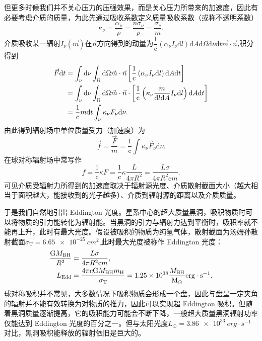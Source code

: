 \documentclass[../天体物理基础.tex]{subfiles}
\begin{document}
但更多时候我们并不关心压力的压强效果，而是关心压力所带来的加速度，因此有必要考虑介质的质量，为此先通过吸收系数定义质量吸收系数（或称不透明系数）
\begin{equation}
\kappa_\nu=\frac{\alpha_\nu}\rho=\frac{n\sigma_{\nu}}{\rho}=\frac{\sigma_\nu}{m}.
\end{equation}
介质吸收某一辐射$I_{\nu}\left(\vec{m}\right)$在$\vec n$方向得到的动量为$\dfrac{1}{\mathrm{c}}\left(\alpha_\nu I_\nu\mathrm{d}l\right)\mathrm{d}A\mathrm{d}\Omega\mathrm{d}\nu\mathrm{d}t\vec{m}\cdot\vec{n}$,积分得到
\begin{align}
\vec{F}\mathrm{d}t&=\int_{\nu}\mathrm{d}\nu\int_{\Omega}\mathrm{d}\Omega\vec{m}\cdot\vec{n}\left[\frac{1}{\mathrm{c}}\left(\alpha_{\nu}I_{\nu}\mathrm{d}l\right)\mathrm{d}A\mathrm{d}t\right]\notag\\
&=\int_{\nu}\mathrm{d}\nu\int_{\Omega}\mathrm{d}\Omega\vec{m}\cdot\vec{n}\cdot\left[\frac{1}{\mathrm{c}}\left(\kappa_{\nu}\frac{m}{\mathrm{d}l\mathrm{d}A}I_{\nu}\mathrm{d}l\right)\mathrm{d}A\mathrm{d}t\right]\notag\\
&=\frac{1}{\mathrm{c}}m\mathrm{d}t\int_{\nu}\kappa_{\nu}F_{\nu}\mathrm{d}\nu.
\end{align}
由此得到辐射场中单位质量受力（加速度）为
\begin{equation}
\vec{f}=\frac{\vec{F}}{m}=\frac{1}{\mathrm{c}}\int\kappa_{\nu}\vec{F}_{\nu}\mathrm{d}\nu.
\end{equation}
在球对称辐射场中常写作
\begin{equation}
f=\frac{1}{\mathrm{c}}\kappa F=\frac{1}{\mathrm{c}}\kappa\dfrac{L}{4\pi R^2}=\frac{L\sigma}{4\pi R^{2}\mathrm{c}m}.
\end{equation}
可见介质受辐射力所得到的加速度取决于辐射源光度、介质散射截面大小（越大相当于面积越大，能接收到的光子越多）、介质到辐射源的距离以及介质质量。

于是我们自然地引出 Eddington 光度。星系中心的超大质量黑洞，吸积物质时可以将物质的引力能转化为辐射能。当黑洞的引力与辐射力达到平衡时，吸积率就不能再上升，此时有最大光度。假设被吸积的物质为纯氢气体，散射截面为汤姆孙散射截面$\sigma_{\text{T}}=\qty{6.65e-25}{cm^{2}}$,此时最大光度被称作 Eddington 光度：
\begin{align}
\frac{\mathrm{G}M_{\text{BH}}}{R^{2}}&=\frac{L\sigma}{4\pi R^{2}\mathrm{c}m},\\
L_{\text{Edd}}&=\frac{4\pi\mathrm{c}\mathrm{G}M_{\text{BH}}m_{\ce{H}}}{\sigma_{\text{T}}}=1.25\times10^{38}\frac{M_{\text{BH}}}{\unit{M_\odot}}\unit{erg\cdot{}s^{-1}}.
\end{align}
球对称吸积并不常见，大多数情况下吸积物质会形成一个盘，因此与盘呈一定夹角的辐射并不能有效转换为对物质的推力，因此可以实现超 Eddington 吸积。但随着黑洞质量逐渐提高，它的吸积能力可能会不断下降，一般超大质量黑洞辐射功率仅能达到 Eddington 光度的百分之一。但与太阳光度$L_{\odot}=\qty{3.86e33}{erg\cdot{}s^{-1}}$对比，黑洞吸积能释放的辐射依旧是巨大的。
\end{document}
